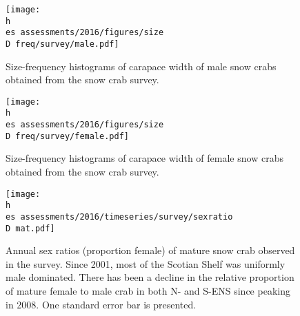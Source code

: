 \documentclass[11pt]{article}
\newcommand{\D}{.}
\newcommand{\h}{\string~}
\newcommand{\es}{bio.data/bio.snowcrab/}
\begin{document}

\begin{figure}
\centering
\texttt{[image: \\h \\es assessments/2016/figures/size\\D freq/survey/male.pdf]}\\ 
\caption{Size-frequency histograms of carapace width of male snow crabs obtained from the snow crab survey.  }
\end{figure}
\clearpage

\begin{figure}
\centering
\texttt{[image: \\h \\es assessments/2016/figures/size\\D freq/survey/female.pdf]}\\ 
\caption{ Size-frequency histograms of carapace width of female snow crabs obtained from the snow crab survey. }
\end{figure}
\clearpage

\begin{figure}
\centering
\texttt{[image: \\h \\es assessments/2016/timeseries/survey/sexratio\\D mat.pdf]}\\ 
\caption{ Annual sex ratios (proportion female) of mature snow crab observed in the survey. Since 2001, most of the Scotian Shelf was uniformly male dominated. There has been a decline in the relative proportion of mature female to male crab in both N- and S-ENS since peaking in 2008. One standard error bar is presented.}
\end{figure}
\clearpage
\end{document}
